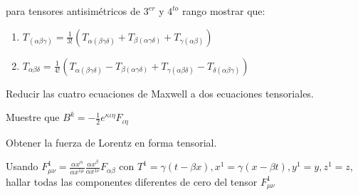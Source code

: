 \documentclass[12pt,a4paper]{practice}
\begin{document}
    \begin{problem}\label{prob:3}
        para tensores antisimétricos de $3^{er}$ y $4^{to}$ rango mostrar que:
        \begin{enumerate}[label=\alph*)]
                \item $T_{(\alpha\beta\gamma)}=\frac{1}{3!}(T_{\alpha(\beta\gamma\delta)}+T_{\beta(\alpha\gamma\delta)} + T_{\gamma(\alpha\beta)} )$
                \item $T_{\alpha\beta\delta}= \frac{1}{4!}(T_{\alpha(\beta\gamma\delta)}-T_{\beta(\alpha\gamma\delta)}+T_{\gamma(\alpha\beta\delta)}-T_{\delta(\alpha\beta\gamma)})$
        \end{enumerate}    
    \end{problem}
    
    \begin{problem}\label{prob:4}
        Reducir las cuatro ecuaciones de Maxwell a dos ecuaciones tensoriales.    
    \end{problem}

    \begin{problem}\label{prob:5}
        Muestre que $B^{k}= -\frac{1}{2}e^{\kappa\iota\eta}F_{\iota\eta}$
    \end{problem}
    
    \begin{problem}\label{prob:6}
        Obtener la fuerza de Lorentz en forma tensorial.    
    \end{problem}
    
    \begin{problem}\label{prob:7}
        Usando $F^{1}_{\mu\nu}=\frac{\alpha x^{\alpha}}{\alpha x^{1\mu}}\frac{\alpha x^{\beta}}{\alpha x^{1\nu}}F_{\alpha\beta}$ con $ T^{1} = \gamma(t- \beta x), x^{1} = \gamma(x-\beta t),y^{1}= y, z^{1}= z$, hallar todas las componentes diferentes de cero del tensor $F^{1}_{\mu\nu}$
    \end{problem}
    
    
\end{document}
